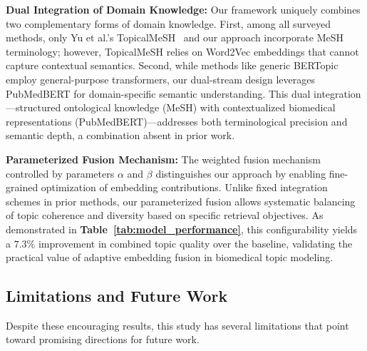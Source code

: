 \documentclass[authorproof,JACIII,researchpaper]{fujipressarticle}
\begin{document}
\textbf{Dual Integration of Domain Knowledge:} Our framework uniquely combines two complementary forms of domain knowledge. First, among all surveyed methods, only Yu et al.'s TopicalMeSH~\cite{yu_improving_2016} and our approach incorporate MeSH terminology; however, TopicalMeSH relies on Word2Vec embeddings that cannot capture contextual semantics. Second, while methods like generic BERTopic~\cite{grootendorst_bertopic_2022} employ general-purpose transformers, our dual-stream design leverages PubMedBERT for domain-specific semantic understanding. This dual integration---structured ontological knowledge (MeSH) with contextualized biomedical representations (PubMedBERT)---addresses both terminological precision and semantic depth, a combination absent in prior work.

\textbf{Parameterized Fusion Mechanism:} The weighted fusion mechanism controlled by parameters $\alpha$ and $\beta$ distinguishes our approach by enabling fine-grained optimization of embedding contributions. Unlike fixed integration schemes in prior methods, our parameterized fusion allows systematic balancing of topic coherence and diversity based on specific retrieval objectives. As demonstrated in \textbf{Table~\ref{tab:model_performance}}, this configurability yields a $7.3\%$ improvement in combined topic quality over the baseline, validating the practical value of adaptive embedding fusion in biomedical topic modeling.

\subsection{Limitations and Future Work}

Despite these encouraging results, this study has several limitations that point toward promising directions for future work.
\end{document}
